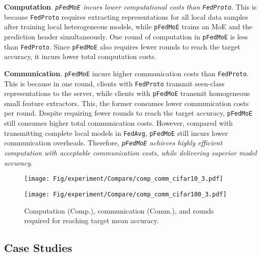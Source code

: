 \documentclass[sigconf]{acmart}
\newcommand{\hetero}{heterogeneous }
\newcommand{\homo}{homogeneous }
\newcommand{\reps}{representations }
\newcommand{\methodname}{{\tt{pFedMoE}}}
\begin{document}
\textbf{Computation}. \textit{\methodname{} incurs lower computational costs than {\tt{FedProto}}}. This is because {\tt{FedProto}} requires extracting \reps for all local data samples after training local \hetero models, while \methodname{} trains an MoE and the prediction header simultaneously. One round of computation in \methodname{} is less than {\tt{FedProto}}. Since \methodname{} also requires fewer rounds to reach the target accuracy, it incurs lower total computation costs. 

\textbf{Communication}. \methodname{} incurs higher communication costs than {\tt{FedProto}}. This is because in one round, clients with {\tt{FedProto}} transmit seen-class \reps to the server, while clients with \methodname{} transmit \homo small feature extractors. This, the former consumes lower communication costs per round. Despite requiring fewer rounds to reach the target accuracy, \methodname{} still consumes higher total communication costs. However, compared with transmitting complete local models in {\tt{FedAvg}}, \methodname{} still incurs lower communication overheads. Therefore, \textit{\methodname{} achieves highly efficient computation with acceptable communication costs, while delivering superior model accuracy.}


\begin{figure}[!t]
\centering
\begin{minipage}[t]{\linewidth}
\centering
\texttt{[image: Fig/experiment/Compare/comp\_comm\_cifar10\_3.pdf]}
\end{minipage}%

\begin{minipage}[t]{\linewidth}
\centering
\texttt{[image: Fig/experiment/Compare/comp\_comm\_cifar100\_3.pdf]}
\end{minipage}%
\vspace{-12pt}
\caption{Computation (Comp.), communication (Comm.), and rounds required for reaching target mean accuracy.}
\label{fig:compare-comm-comp}
\vspace{-12pt}
\end{figure}







\subsection{Case Studies}
\end{document}
